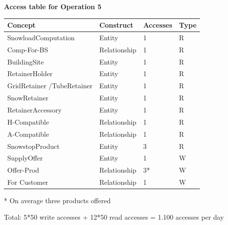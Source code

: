 \documentclass{article}[h]
\begin{document}
{{\centering \textbf{Access table for Operation 5}\\}
\begin{table}[H]
  \def\arraystretch{1.10}%
  \centering
  \begin{tabular}{ | m{4cm} | m{4cm}| m{3cm} | m{2cm} |} 
    \hline
    {\textbf{\large Concept}} & {\textbf{\large Construct}} & {\textbf{\large Accesses}} & {\textbf{\large Type}} \\
    \hline
    \color[HTML]{3531FF} SnowloadComputation & Entity & 1 & R \\ 
    \hline
    \color[HTML]{3531FF} Comp-For-BS & Relationship & 1 & R \\ 
    \hline
    \color[HTML]{3531FF} BuildingSite & Entity & 1 & R \\ 
    \hline
    \color[HTML]{3531FF} RetainerHolder & Entity & 1 & R \\ 
    \hline
    \color[HTML]{3531FF} GridRetainer /\newline TubeRetainer & Entity & 1 & R \\ 
    \hline
    \color[HTML]{3531FF} SnowRetainer & Entity & 1 & R \\ 
    \hline
    \color[HTML]{3531FF} RetainerAccessory & Entity & 1 & R \\ 
    \hline
    \color[HTML]{3531FF} H-Compatible & Relationship & 1 & R \\ 
    \hline
    \color[HTML]{3531FF} A-Compatible & Relationship & 1 & R \\ 
    \hline
    \color[HTML]{3531FF} SnowstopProduct & Entity & 3 & R \\ 
    \hline
    \color[HTML]{3531FF} SupplyOffer & Entity & 1 & W \\ 
    \hline
    \color[HTML]{3531FF} Offer-Prod & Relationship & 3* & W \\ 
    \hline
    \color[HTML]{3531FF} For Customer & Relationship & 1 & W \\ 
    \hline
  \end{tabular}
  \small{* On average three products offered}
\end{table}
Total: 5*50 write accesses + 12*50 read accesses = 1.100 accesses per day

\pagebreak

}
\end{document}
